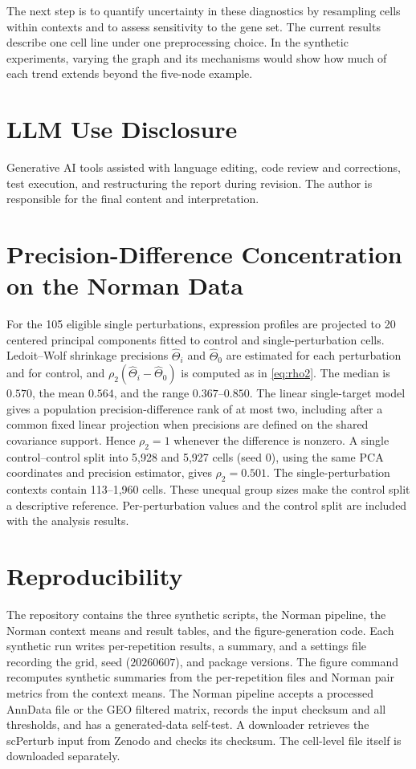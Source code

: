 \documentclass{article}
\begin{document}
The next step is to quantify uncertainty in these diagnostics by resampling cells within contexts and to assess sensitivity to the gene set. The current results describe one cell line under one preprocessing choice. In the synthetic experiments, varying the graph and its mechanisms would show how much of each trend extends beyond the five-node example.

\section*{LLM Use Disclosure}
Generative AI tools assisted with language editing, code review and corrections, test execution, and restructuring the report during revision. The author is responsible for the final content and interpretation.

{\small


}

\appendix

\section{Precision-Difference Concentration on the Norman Data}
\label{app:rho2}

For the 105 eligible single perturbations, expression profiles are projected to 20 centered principal components fitted to control and single-perturbation cells. Ledoit--Wolf shrinkage precisions $\widehat\Theta_i$ and $\widehat\Theta_0$ are estimated for each perturbation and for control, and $\rho_2(\widehat\Theta_i-\widehat\Theta_0)$ is computed as in \cref{eq:rho2}. The median is $0.570$, the mean $0.564$, and the range $0.367$--$0.850$. The linear single-target model gives a population precision-difference rank of at most two, including after a common fixed linear projection when precisions are defined on the shared covariance support. Hence $\rho_2=1$ whenever the difference is nonzero. A single control--control split into 5,928 and 5,927 cells (seed 0), using the same PCA coordinates and precision estimator, gives $\rho_2=0.501$. The single-perturbation contexts contain 113--1,960 cells. These unequal group sizes make the control split a descriptive reference. Per-perturbation values and the control split are included with the analysis results.

\section{Reproducibility}

The repository contains the three synthetic scripts, the Norman pipeline, the Norman context means and result tables, and the figure-generation code. Each synthetic run writes per-repetition results, a summary, and a settings file recording the grid, seed ($20260607$), and package versions. The figure command recomputes synthetic summaries from the per-repetition files and Norman pair metrics from the context means. The Norman pipeline accepts a processed AnnData file or the GEO filtered matrix, records the input checksum and all thresholds, and has a generated-data self-test. A downloader retrieves the scPerturb input from Zenodo and checks its checksum. The cell-level file itself is downloaded separately.
\end{document}
